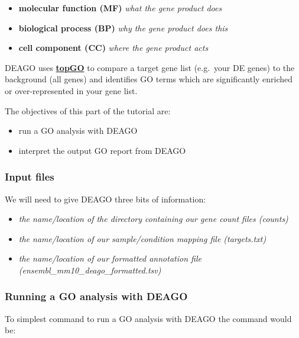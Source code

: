 \documentclass[11pt]{article}
\providecommand{\tightlist}{%
      \setlength{\itemsep}{0pt}\setlength{\parskip}{0pt}}
\begin{document}
\begin{itemize}
\item
  \textbf{molecular function (MF)} \textit{what the gene product does}
\item
  \textbf{biological process (BP)} \textit{why the gene product does this}
\item
  \textbf{cell component (CC)} \textit{where the gene product acts}
\end{itemize}

DEAGO uses
\textbf{\href{https://bioconductor.org/packages/release/bioc/html/topGO.html}{topGO}}
to compare a target gene list (e.g.~your DE genes) to the background
(all genes) and identifies GO terms which are significantly enriched or
over-represented in your gene list.

The objectives of this part of the tutorial are:

\begin{itemize}
\tightlist
\item
  run a GO analysis with DEAGO
\item
  interpret the output GO report from DEAGO
\end{itemize}

\hypertarget{input-files}{%
\subsubsection{Input files}\label{input-files}}

We will need to give DEAGO three bits of information:

\begin{itemize}
\item
  \textit{the name/location of the directory containing our gene count
  files (counts)}
\item
  \textit{the name/location of our sample/condition mapping file
  (targets.txt)}
\item
  \textit{the name/location of our formatted annotation file
  (ensembl\_mm10\_deago\_formatted.tsv)}
\end{itemize}

\hypertarget{running-a-go-analysis-with-deago}{%
\subsubsection{Running a GO analysis with
DEAGO}\label{running-a-go-analysis-with-deago}}

To simplest command to run a GO analysis with DEAGO the command would
be:
\end{document}
